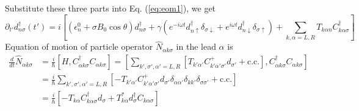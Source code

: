 \documentclass[11pt,a4paper]{article}
\begin{document}
Substitute these three parts into Eq. (\ref{eq:eom1}), we get
\begin{equation}
\partial_{t'} d_{n\sigma}^{\dag}(t') = i[(\epsilon_{n}^{0}+\sigma B_{0} \cos \theta) d_{n\sigma}^{\dag} + \gamma(e^{-i \omega t} d_{n\uparrow}^{\dag} \delta_{\sigma\downarrow} + e^{i \omega t} d_{n\downarrow}^{\dag} \delta_{\sigma\uparrow}) + \sum_{k, \alpha=L, R}T_{k \alpha n} C_{k \alpha \sigma}^{\dag}]
\end{equation}
Equation of motion of particle operator $\hat{N}_{\alpha k\sigma}$ in the lead $\alpha$ is
\begin{equation}
\begin{split}
\frac{d}{dt}\hat{N}_{\alpha k\sigma} &= \frac{i}{\hbar}[H, C_{\alpha k\sigma}^{\dag}C_{\alpha k\sigma}] = \left[\sum_{k', \sigma', \alpha'=L, R}\left[T_{k' \alpha'} C_{k' \alpha' \sigma'}^{+} d_{\sigma'}+\mathrm{c.c.}\right], C_{\alpha k\sigma}^{\dag}C_{\alpha k\sigma}\right]\\
&=\frac{i}{\hbar}\sum_{k', \sigma', \alpha'=L, R}\left[ -T_{k' \alpha'} C_{k' \alpha' \sigma'}^{+} d_{\sigma'}\delta_{\alpha\alpha'}\delta_{kk'}\delta_{\sigma\sigma'}+\mathrm{c.c.}\right]\\
&=\frac{i}{\hbar}[-T_{k \alpha} C_{k \alpha \sigma}^{\dag} d_{\sigma} + T_{k \alpha}^{*} d_{\sigma}^{\dag}C_{k \alpha \sigma}]
\end{split}
\end{equation}
\end{document}
